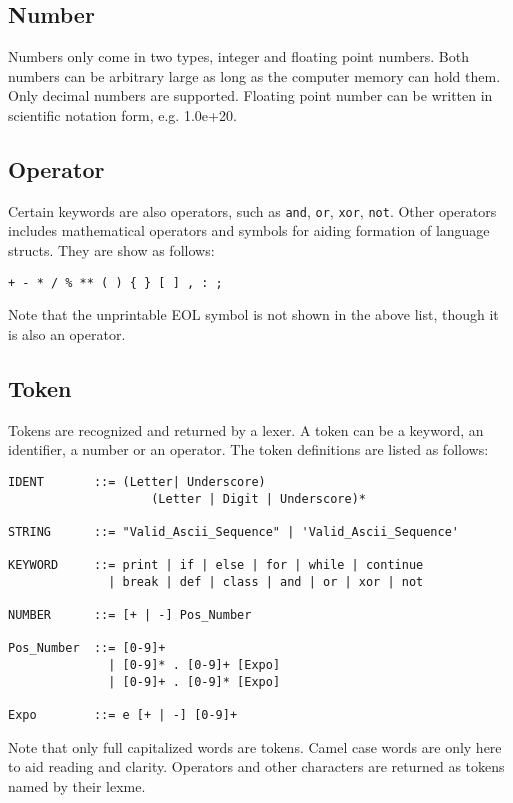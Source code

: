 \documentclass[10pt,a4paper]{article}
\begin{document}
\subsection{Number}
Numbers only come in two types, integer and floating point numbers.
Both numbers can be arbitrary large as long as the computer memory
can hold them. Only decimal numbers are supported. Floating point
number can be written in scientific notation form, e.g. 1.0e+20.

\subsection{Operator}
Certain keywords are also operators, such as \lstinline$and$, 
\lstinline$or$, \lstinline$xor$, \lstinline$not$. Other operators
includes mathematical operators and symbols for aiding formation
of language structs. They are show as follows:
\begin{lstlisting}
+ - * / % ** ( ) { } [ ] , : ;
\end{lstlisting}
Note that the unprintable EOL symbol is not shown in the above list,
though it is also an operator. 

\subsection{Token}
Tokens are recognized and returned by a lexer. A token can be a keyword,
an identifier, a number or an operator. The token definitions are listed
as follows:

\begin{verbatim}
IDENT       ::= (Letter| Underscore) 
                    (Letter | Digit | Underscore)*

STRING      ::= "Valid_Ascii_Sequence" | 'Valid_Ascii_Sequence'

KEYWORD     ::= print | if | else | for | while | continue 
              | break | def | class | and | or | xor | not
              
NUMBER      ::= [+ | -] Pos_Number

Pos_Number  ::= [0-9]+ 
              | [0-9]* . [0-9]+ [Expo] 
              | [0-9]+ . [0-9]* [Expo]

Expo        ::= e [+ | -] [0-9]+
\end{verbatim}

Note that only full capitalized words are tokens. Camel case words
are only here to aid reading and clarity. 
Operators and other characters are returned as tokens named by their lexme.
\end{document}

